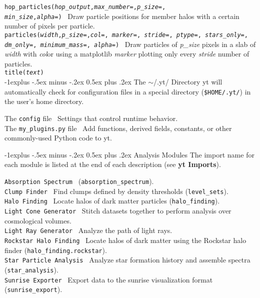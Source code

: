 \documentclass[10pt,landscape]{article}
\makeatletter
\renewcommand{\subsection}{\@startsection{subsection}{2}{0mm}%
                                {-1explus -.5ex minus -.2ex}%
                                {0.5ex plus .2ex}%
                                {\normalfont\normalsize\bfseries}}
\makeatother
\begin{document}
\begin{multicols}{3}
\texttt{hop\_particles({\it hop\_output},{\it max\_number=},{\it p\_size=},\\
{\it min\_size},{\it alpha=})} \textemdash\ Draw particle positions for member halos with a certain number of pixels per particle.\\
\texttt{particles({\it width},{\it p\_size=},{\it col=}, {\it marker=}, {\it stride=}, {\it ptype=}, {\it stars\_only=}, {\it dm\_only=}, {\it minimum\_mass=}, {\it alpha=})}  \textemdash\  Draw particles of {\it p\_size} pixels in a slab of {\it width} with {\it col}or using a matplotlib {\it marker} plotting only every {\it stride} number of particles.\\
\texttt{title({\it text})}\\

\subsection{The $\sim$/.yt/ Directory}
yt will automatically check for configuration files in a special directory (\texttt{\$HOME/.yt/}) in the user's home directory.

The \texttt{config} file \textemdash\ Settings that control runtime behavior. \\
The \texttt{my\_plugins.py} file \textemdash\ Add functions, derived fields, constants, or other commonly-used Python code to yt.


\subsection{Analysis Modules}
The import name for each module is listed at the end of each description (see \textbf{yt Imports}).

\texttt{Absorption Spectrum} \textemdash\ (\texttt{absorption\_spectrum}). \\
\texttt{Clump Finder} \textemdash\ Find clumps defined by density thresholds (\texttt{level\_sets}). \\
\texttt{Halo Finding} \textemdash\ Locate halos of dark matter particles (\texttt{halo\_finding}). \\
\texttt{Light Cone Generator} \textemdash\ Stitch datasets together to perform analysis over cosmological volumes. \\
\texttt{Light Ray Generator} \textemdash\ Analyze the path of light rays.\\
\texttt{Rockstar Halo Finding} \textemdash\ Locate halos of dark matter using the Rockstar halo finder (\texttt{halo\_finding.rockstar}). \\
\texttt{Star Particle Analysis} \textemdash\ Analyze star formation history and assemble spectra (\texttt{star\_analysis}). \\
\texttt{Sunrise Exporter} \textemdash\ Export data to the sunrise visualization format (\texttt{sunrise\_export}). \\



\end{multicols}
\end{document}
